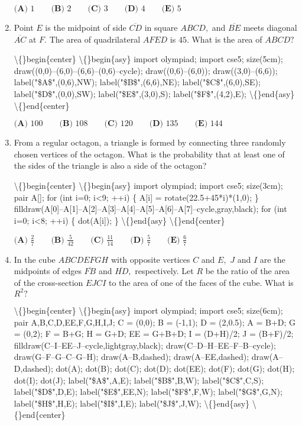 \documentclass{article}
\begin{document}
\begin{enumerate}[label=\arabic*., itemsep=0.5em]
\(\textbf{(A) }1\qquad\textbf{(B) }2\qquad\textbf{(C) }3\qquad\textbf{(D) }4\qquad \textbf{(E) }5\)\par \vspace{0.5em}\item Point \(E\) is the midpoint of side \(\overline{CD}\) in square \(ABCD,\) and \(\overline{BE}\) meets diagonal \(\overline{AC}\) at \(F.\) The area of quadrilateral \(AFED\) is \(45.\) What is the area of \(ABCD?\)


\textbackslash\{\}begin\{center\}
\textbackslash\{\}begin\{asy\}
import olympiad;
import cse5;
size(5cm);
draw((0,0)--(6,0)--(6,6)--(0,6)--cycle);
draw((0,6)--(6,0)); draw((3,0)--(6,6));
label("\$A\$",(0,6),NW);
label("\$B\$",(6,6),NE);
label("\$C\$",(6,0),SE);
label("\$D\$",(0,0),SW);
label("\$E\$",(3,0),S);
label("\$F\$",(4,2),E);
\textbackslash\{\}end\{asy\}
\textbackslash\{\}end\{center\}


\(\textbf{(A) } 100 \qquad \textbf{(B) } 108 \qquad \textbf{(C) } 120 \qquad \textbf{(D) } 135 \qquad \textbf{(E) } 144\)\par \vspace{0.5em}\item From a regular octagon, a triangle is formed by connecting three randomly chosen vertices of the octagon. What is the probability that at least one of the sides of the triangle is also a side of the octagon?


\textbackslash\{\}begin\{center\}
\textbackslash\{\}begin\{asy\}
import olympiad;
import cse5;
size(3cm);
pair A[];
for (int i=0; i<9; ++i) \{
A[i] = rotate(22.5+45*i)*(1,0);
\}
filldraw(A[0]--A[1]--A[2]--A[3]--A[4]--A[5]--A[6]--A[7]--cycle,gray,black);
for (int i=0; i<8; ++i) \{ dot(A[i]); \}
\textbackslash\{\}end\{asy\}
\textbackslash\{\}end\{center\}


\(\textbf{(A) } \frac{2}{7} \qquad \textbf{(B) } \frac{5}{42} \qquad \textbf{(C) } \frac{11}{14} \qquad \textbf{(D) } \frac{5}{7} \qquad \textbf{(E) } \frac{6}{7}\)\par \vspace{0.5em}\item In the cube \(ABCDEFGH\) with opposite vertices \(C\) and \(E,\) \(J\) and \(I\) are the midpoints of edges \(\overline{FB}\) and \(\overline{HD},\) respectively. Let \(R\) be the ratio of the area of the cross-section \(EJCI\) to the area of one of the faces of the cube. What is \(R^2?\)


\textbackslash\{\}begin\{center\}
\textbackslash\{\}begin\{asy\}
import olympiad;
import cse5;
size(6cm);
pair A,B,C,D,EE,F,G,H,I,J;
C = (0,0);
B = (-1,1);
D = (2,0.5);
A = B+D;
G = (0,2);
F = B+G;
H = G+D;
EE = G+B+D;
I = (D+H)/2; J = (B+F)/2;
filldraw(C--I--EE--J--cycle,lightgray,black);
draw(C--D--H--EE--F--B--cycle); 
draw(G--F--G--C--G--H);
draw(A--B,dashed); draw(A--EE,dashed); draw(A--D,dashed);
dot(A); dot(B); dot(C); dot(D); dot(EE); dot(F); dot(G); dot(H); dot(I); dot(J);
label("\$A\$",A,E);
label("\$B\$",B,W);
label("\$C\$",C,S);
label("\$D\$",D,E);
label("\$E\$",EE,N);
label("\$F\$",F,W);
label("\$G\$",G,N);
label("\$H\$",H,E);
label("\$I\$",I,E);
label("\$J\$",J,W);
\textbackslash\{\}end\{asy\}
\textbackslash\{\}end\{center\}



\end{enumerate}
\end{document}
